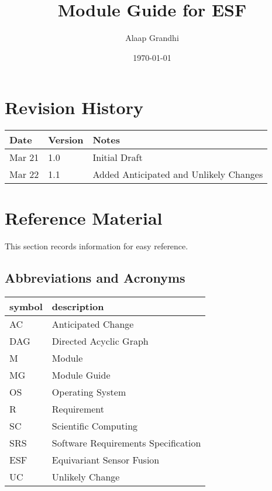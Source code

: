 \documentclass[12pt, titlepage]{article}
\newcommand{\ProjectName}{ESF }
\begin{document}
\title{Module Guide for \ProjectName} 
\author{Alaap Grandhi}
\date{\today}

\maketitle


\section{Revision History}

\begin{tabularx}{\textwidth}{p{3cm}p{2cm}X}
\toprule {\bf Date} & {\bf Version} & {\bf Notes}\\
\midrule
Mar 21 & 1.0 & Initial Draft\\
Mar 22 & 1.1 & Added Anticipated and Unlikely Changes\\
\bottomrule
\end{tabularx}

\newpage

\section{Reference Material}

This section records information for easy reference.

\subsection{Abbreviations and Acronyms}

\renewcommand{\arraystretch}{1.2}
\begin{tabular}{l l} 
  \toprule		
  \textbf{symbol} & \textbf{description}\\
  \midrule 
  AC & Anticipated Change\\
  DAG & Directed Acyclic Graph \\
  M & Module \\
  MG & Module Guide \\
  OS & Operating System \\
  R & Requirement\\
  SC & Scientific Computing \\
  SRS & Software Requirements Specification\\
  \ProjectName & Equivariant Sensor Fusion\\
  UC & Unlikely Change \\
  \bottomrule
\end{tabular}\\
\end{document}
